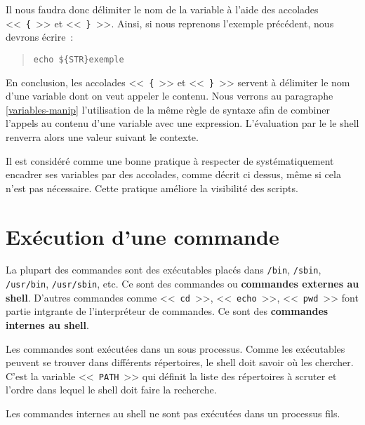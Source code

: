 Il nous faudra donc d\'{e}limiter le nom de la variable \`{a} l'aide des accolades <<~\verb={=~>> et
<<~\verb=}=~>>. Ainsi, si nous reprenons l'exemple pr\'{e}c\'{e}dent, nous devrons \'{e}crire~:
\begin{quote}
	\texttt{echo \$\{STR\}exemple}
\end{quote}

En conclusion, les accolades <<~\verb={=~>> et <<~\verb=}=~>> servent \`{a} d\'{e}limiter le nom d'une
variable dont on veut appeler le contenu. Nous verrons au paragraphe \ref{variables-manip} l'utilisation de
la m\^{e}me r\`{e}gle de syntaxe afin de combiner l'appels au contenu d'une variable avec une
expression. L'{\'e}valuation par le le shell {\Unix}
renverra alors une valeur suivant le contexte.

\begin{remarque}
Il est consid{\'e}r{\'e} comme une bonne pratique \`{a} respecter de syst{\'e}matiquement encadrer ses 
variables par des accolades, comme d{\'e}crit ci dessus, m{\^e}me si cela n'est pas n{\'e}cessaire.
Cette pratique am{\'e}liore la visibilit{\'e} des scripts.
\end{remarque}

\section{\label{basicnot-exec}Ex{\'e}cution d'une commande}

La plupart des commandes sont des ex{\'e}cutables plac{\'e}s dans
\texttt{/bin}, \texttt{/sbin}, \texttt{/usr/bin}, \texttt{/usr/sbin},
etc. Ce sont des commandes {\Unix} ou
\textbf{commandes externes au shell}. D'autres
commandes comme <<~\texttt{cd}~>>, <<~\texttt{echo}~>>,
<<~\texttt{pwd}~>> font partie intgrante de l'interpr{\'e}teur de commandes.
Ce sont des \textbf{commandes internes au shell}.

Les commandes {\Unix} sont ex{\'e}cut{\'e}es dans un sous processus.
Comme les ex{\'e}cutables peuvent se trouver dans diff{\'e}rents
r{\'e}pertoires, le shell doit savoir o{\`u} les chercher. C'est la
variable <<~\texttt{PATH}~>> qui
d{\'e}finit la liste des r{\'e}pertoires {\`a} scruter et l'ordre dans
lequel le shell doit faire la recherche.

\begin{remarque}
Les commandes internes au shell ne sont pas ex{\'e}cut{\'e}es dans un processus fils.
\end{remarque}


